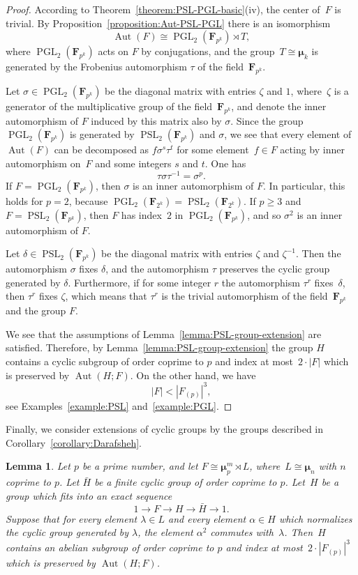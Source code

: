 \documentclass[12pt]{amsart}
\numberwithin{equation}{section}
\newtheorem{lemma}[subsection]{Lemma}
\theoremstyle{definition}
\newcommand{\mumu}{\boldsymbol{\mu}}
\DeclareMathOperator{\Aut}{Aut}
\DeclareMathOperator{\PGL}{PGL}
\DeclareMathOperator{\PSL}{PSL}
\def \ge {\geqslant}
\begin{document}
\begin{proof}
According to Theorem~\ref{theorem:PSL-PGL-basic}(iv),
the center of~$F$ is trivial.
By Proposition~\ref{proposition:Aut-PSL-PGL}
there is an isomorphism
$$
\Aut(F)\cong
\PGL_2(\mathbf{F}_{p^k})\rtimes T,
$$
where $\PGL_2(\mathbf{F}_{p^k})$ acts on $F$ by conjugations, and the
group~\mbox{$T\cong\mumu_k$} is generated by the Frobenius
automorphism $\tau$ of the field~$\mathbf{F}_{p^k}$.

Let $\sigma\in\PGL_2(\mathbf{F}_{p^k})$ be
the diagonal matrix with entries
$\zeta$ and $1$, where~$\zeta$ is a generator of the
multiplicative group of the field~$\mathbf{F}_{p^k}$, and denote
the inner automorphism of $F$ induced by this matrix also by $\sigma$.
Since the group~$\PGL_2(\mathbf{F}_{p^k})$ is generated by $\PSL_2(\mathbf{F}_{p^k})$
and $\sigma$, we see that every element of~$\Aut(F)$ can be decomposed
as $f\sigma^s\tau^t$ for some element~\mbox{$f\in F$} acting by inner automorphism on~$F$ and some integers $s$ and $t$.
One has
$$
\tau\sigma\tau^{-1}=\sigma^p.
$$
If $F=\PGL_2(\mathbf{F}_{p^k})$, then $\sigma$ is an inner automorphism of $F$.
In particular, this holds for $p=2$, because
$\PGL_2(\mathbf{F}_{2^k})=\PSL_2(\mathbf{F}_{2^k})$.
If $p\ge 3$ and $F=\PSL_2(\mathbf{F}_{p^k})$, then $F$ has index~$2$ in $\PGL_2(\mathbf{F}_{p^k})$, and so $\sigma^2$ is an inner automorphism of $F$.

Let $\delta\in\PSL_2(\mathbf{F}_{p^k})$ be
the diagonal matrix with entries
$\zeta$ and $\zeta^{-1}$.
Then the automorphism $\sigma$ fixes $\delta$, and
the automorphism $\tau$ preserves the cyclic group generated by $\delta$.
Furthermore, if for some integer $r$ the automorphism $\tau^r$ fixes~$\delta$, then
$\tau^r$ fixes $\zeta$, which means that $\tau^r$ is the trivial automorphism of
the field~$\mathbf{F}_{p^k}$ and the group $F$.

We see that the assumptions of Lemma~\ref{lemma:PSL-group-extension}
are satisfied.
Therefore, by Lemma~\ref{lemma:PSL-group-extension}
the group $H$ contains a cyclic subgroup of order coprime to $p$ and index at most~\mbox{$2\cdot |F|$} which is preserved by $\Aut(H;F)$.
On the other hand, we have
$$
|F|<|F_{(p)}|^3,
$$
see Examples~\ref{example:PSL}
and~\ref{example:PGL}.
\end{proof}

Finally, we consider extensions of cyclic groups by the groups
described in Corollary~\ref{corollary:Darafsheh}.

\begin{lemma}\label{lemma:Darafsheh-group-extension}
Let $p$ be a prime number, and let $F\cong\mumu_p^m\rtimes L$,
where~\mbox{$L\cong \mumu_n$} with $n$ coprime to $p$.
Let $\bar{H}$ be a finite cyclic group of order coprime to $p$.
Let~$H$ be a group which fits into an exact sequence
$$
1\to F\to H\to \bar{H}\to 1.
$$
Suppose that for every element
$\lambda\in L$ and every element $\alpha\in H$
which normalizes the cyclic group generated by $\lambda$, the element $\alpha^2$
commutes with~$\lambda$.
Then~$H$ contains an abelian subgroup of order coprime to $p$ and index at
most~$2\cdot |F_{(p)}|^3$ which is preserved by $\Aut(H;F)$.
\end{lemma}
\end{document}
